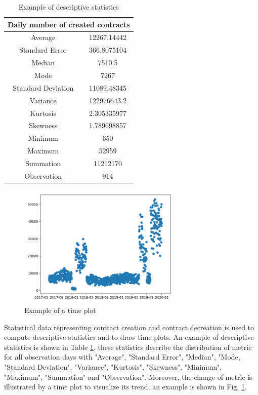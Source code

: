 \begin{table}[h]
\caption{Example of descriptive statistics}
\label{tab:descriptive-statistics}
\renewcommand\arraystretch{0.7}
\begin{tabular}{@{}cc@{}}
\toprule
\multicolumn{2}{c}{Daily number of created contracts} \\
\midrule
Average                & 12267.14442    \\
Standard Error         & 366.8075104    \\
Median                 & 7510.5         \\
Mode                   & 7267           \\
Standard Deviation     & 11089.48345    \\
Variance               & 122976643.2    \\
Kurtosis               & 2.305335977    \\
Skewness               & 1.789698857    \\
Minimum                & 650            \\
Maximum                & 52959          \\
Summation              & 11212170       \\
Observation            & 914            \\
\bottomrule
\end{tabular}
\end{table}

\begin{figure}[htb]
	\includegraphics[width=0.7\textwidth]{gfx/created-contracts.png}
	\caption{Example of a time plot}
	\label{fig:created-contracts}
\end{figure}

Statistical data representing contract creation and contract decreation is used to compute descriptive statistics and to draw time plots. An example of descriptive statistics is shown in Table \ref{tab:descriptive-statistics}, these statistics describe the distribution of metric for all observation days with "Average", "Standard Error", "Median", "Mode, "Standard Deviation", "Variance", "Kurtosis", "Skewness", "Minimum", "Maximum", "Summation" and "Observation". Moreover, the change of metric is illustrated by a time plot to visualize its trend, an example is shown in Fig. \ref{fig:created-contracts}.

